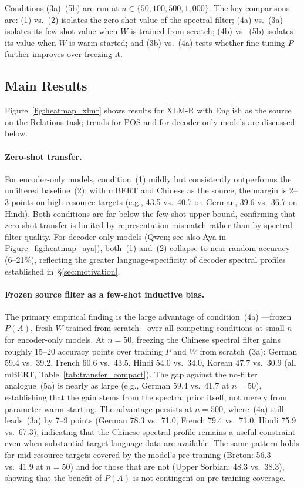 \noindent Conditions (3a)--(5b) are run at
$n \in \{50, 100, 500, 1{,}000\}$.
The key comparisons are:
(1) vs.\ (2) isolates the zero-shot value of the spectral filter;
(4a) vs.\ (3a) isolates its few-shot value when $W$ is trained from
scratch;
(4b) vs.\ (5b) isolates its value when $W$ is warm-started;
and (3b) vs.\ (4a) tests whether fine-tuning $P$ further improves
over freezing it.

\subsection{Main Results}

Figure~\ref{fig:heatmap_xlmr} shows results for XLM-R with English
as the source on the Relations task; trends for POS and for
decoder-only models are discussed below.

\paragraph{Zero-shot transfer.}
For encoder-only models, condition~(1) mildly but consistently
outperforms the unfiltered baseline~(2): with mBERT and Chinese as
the source, the margin is 2--3 points on high-resource targets
(e.g., 43.5 vs.\ 40.7 on German, 39.6 vs.\ 36.7 on Hindi).
Both conditions are far below the few-shot upper bound, confirming
that zero-shot transfer is limited by representation mismatch rather
than by spectral filter quality.
For decoder-only models (Qwen; see also Aya in
Figure~\ref{fig:heatmap_aya}), both~(1) and~(2) collapse to near-random
accuracy (6--21\%), reflecting the greater language-specificity of
decoder spectral profiles established in~§\ref{sec:motivation}.

\paragraph{Frozen source filter as a few-shot inductive bias.}
The primary empirical finding is the large advantage of condition~(4a)
---frozen $P(A)$, fresh $W$ trained from scratch---over all competing
conditions at small $n$ for encoder-only models.
At $n{=}50$, freezing the Chinese spectral filter gains roughly 15--20
accuracy points over training $P$ and $W$ from scratch~(3a): German
59.4 vs.\ 39.2, French 60.6 vs.\ 43.5, Hindi 54.0 vs.\ 34.0, Korean
47.7 vs.\ 30.9 (all mBERT, Table~\ref{tab:transfer_compact}).
The gap against the no-filter analogue~(5a) is nearly as large
(e.g., German 59.4 vs.\ 41.7 at $n{=}50$), establishing that the
gain stems from the spectral prior itself, not merely from parameter
warm-starting.
The advantage persists at $n{=}500$, where~(4a) still leads~(3a) by
7--9 points (German 78.3 vs.\ 71.0, French 79.4 vs.\ 71.0, Hindi
75.9 vs.\ 67.3), indicating that the Chinese spectral profile remains
a useful constraint even when substantial target-language data are
available.
The same pattern holds for mid-resource targets covered by the model's
pre-training (Breton: 56.3 vs.\ 41.9 at $n{=}50$) and for those that
are not (Upper Sorbian: 48.3 vs.\ 38.3), showing that the benefit
of $P(A)$ is not contingent on pre-training coverage.

